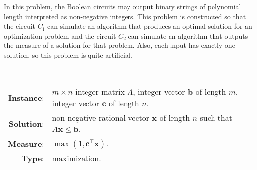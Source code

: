 In this problem, the Boolean circuits may output binary strings of polynomial length interpreted as non-negative integers.
This problem is constructed so that the circuit $C_1$ can simulate an algorithm that produces an optimal solution for an optimization problem and the circuit $C_2$ can simulate an algorithm that outputs the measure of a solution for that problem.
Also, each input has exactly one solution, so this problem is quite artificial.

\begin{definition}
  \mbox{} \\
  \begin{tabular}{r p{9.5cm}}
    \textbf{Instance:} & $m \times n$ integer matrix $A$, integer vector $\mathbf{b}$ of length $m$, integer vector $\mathbf{c}$ of length $n$. \\
    \textbf{Solution:} & non-negative rational vector $\mathbf{x}$ of length $n$ such that $A \mathbf{x} \leq \mathbf{b}$. \\
    \textbf{Measure:} & $\max(1, \mathbf{c}^\intercal \mathbf{x})$. \\
    \textbf{Type:} & maximization.
  \end{tabular}
\end{definition}

